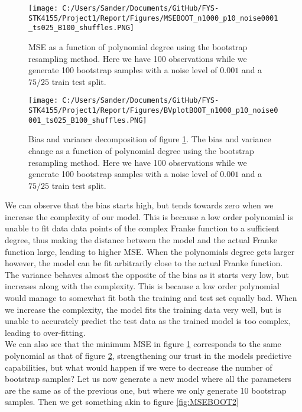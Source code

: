 \documentclass[12pt,a4paper]{article}
\begin{document}
\begin{figure}[H]
\centering
\texttt{[image: C:/Users/Sander/Documents/GitHub/FYS-STK4155/Project1/Report/Figures/MSEBOOT\_n1000\_p10\_noise0001\_ts025\_B100\_shuffles.PNG]}
\caption{\label{fig:MSEBOOT1} MSE as a function of polynomial degree using the bootstrap resampling method. Here we have 100 observations while we generate 100 bootstrap samples with a noise level of $0.001$ and a $75/25$ train test split.}
\end{figure}

\begin{figure}[H]
\centering
\texttt{[image: C:/Users/Sander/Documents/GitHub/FYS-STK4155/Project1/Report/Figures/BVplotBOOT\_n1000\_p10\_noise0001\_ts025\_B100\_shuffles.PNG]}
\caption{\label{fig:BVBOOT1} Bias and variance decomposition of figure \ref{fig:MSEBOOT1}. The bias and variance change as a function of polynomial degree using the bootstrap resampling method. Here we have 100 observations while we generate 100 bootstrap samples with a noise level of $0.001$ and a $75/25$ train test split.}
\end{figure}

\noindent We can observe that the bias starts high, but tends towards zero when we increase the complexity of our model. This is because a low order polynomial is unable to fit data data points of the complex Franke function to a sufficient degree, thus making the distance between the model and the actual Franke function large, leading to higher MSE. When the polynomials degree gets larger however, the model can be fit arbitrarily close to the actual Franke function. 
\\
The variance behaves almost the opposite of the bias as it starts very low, but increases along with the complexity. This is because a low order polynomial would manage to somewhat fit both the training and test set equally bad. When we increase the complexity, the model fits the training data very well, but is unable to accurately predict the test data as the trained model is too complex, leading to over-fitting. 
\\
We can also see that the minimum MSE in figure \ref{fig:MSEBOOT1} corresponds to the same polynomial as that of figure \ref{fig:BVBOOT1}, strengthening our trust in the models predictive capabilities, but what would happen if we were to decrease the number of bootstrap samples? Let us now generate a new model where all the parameters are the same as of the previous one, but where we only generate 10 bootstrap samples. Then we get something akin to figure \ref{fig:MSEBOOT2}
\end{document}
